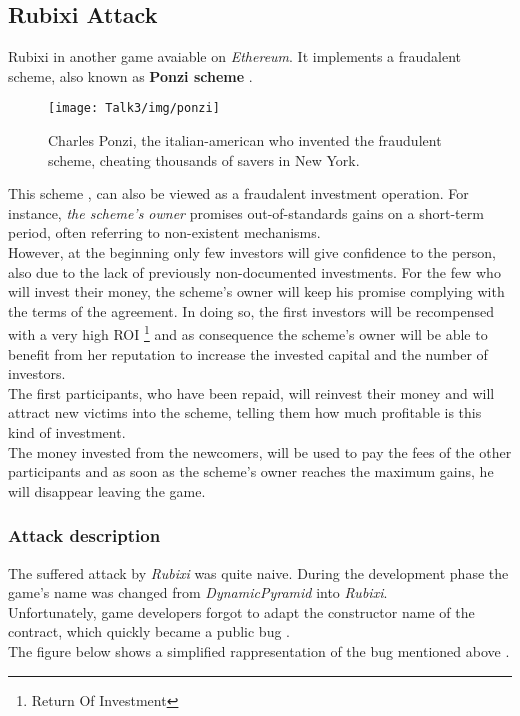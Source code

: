 \subsection{Rubixi Attack}
Rubixi \cite{rubixi1, rubixi2} in another game avaiable on \textit{Ethereum}. It implements a fraudalent scheme, also known as \textbf{Ponzi scheme} \cite{paper2}. \\


\begin{figure}[H]
\begin{center}
\texttt{[image: Talk3/img/ponzi]}
\end{center}
\caption{Charles Ponzi, the italian-american who invented the fraudulent scheme,  cheating thousands of savers in New York.}
\label{label}
\end{figure}





This scheme \cite{ponzi}, can also be viewed as a fraudalent investment operation. For instance, \textit{the scheme's owner} promises out-of-standards gains on a short-term period, often referring to non-existent mechanisms. \\ 
However, at the beginning only few investors will give confidence to the person, also due to the lack of previously non-documented investments. 
For the few who will invest their money, the scheme's owner will keep his promise complying with the terms of the agreement. In doing so, the first investors will be recompensed with a very high ROI \footnote{Return Of Investment} and as consequence the scheme's owner will be able to benefit from her reputation to increase the invested capital and the number of investors. \\
The first participants, who have been repaid, will reinvest their money and will attract new victims into the scheme, telling them how much profitable is this kind of investment. \\
The money invested from the newcomers, will be used to pay the fees of the other participants and as soon as the scheme's owner reaches the maximum gains, he will disappear leaving the game. \\
\subsubsection{Attack description}
The suffered attack by \textit{Rubixi} was quite naive. During the development phase the game's name was changed from \textit{DynamicPyramid} into \textit{Rubixi}. \\
Unfortunately, game developers forgot to adapt the constructor name of the contract, which quickly became a public bug \cite{paper2}. \\
The figure below shows a simplified rappresentation of the bug mentioned above \cite{paper2}.

